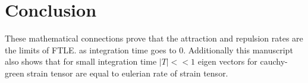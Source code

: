 \documentclass[../report.tex]{subfiles}
\begin{document}
\chapter{Conclusion}

These mathematical connections prove that the attraction and repulsion rates are the limits of FTLE. as integration time goes to 0. Additionally this manuscript also shows that for small integration time \(|T| << 1\) eigen vectors for cauchy-green strain tensor are equal to eulerian rate of strain tensor.
\end{document}
